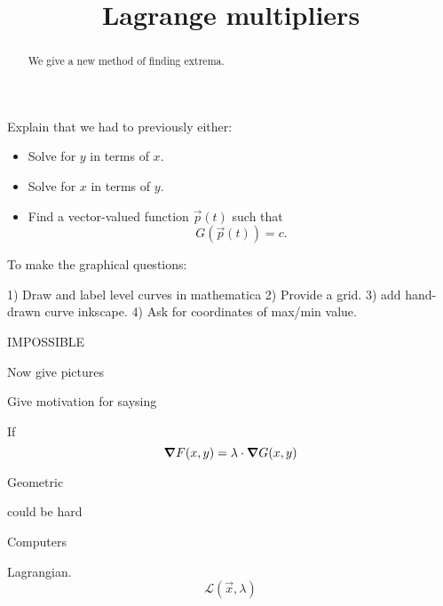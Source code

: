 \documentclass{ximera}
\title[Dig-In:]{Lagrange multipliers}
\begin{document}
\begin{abstract}
  We give a new method of finding extrema. 
\end{abstract}
\maketitle

Explain that we had to previously either:
\begin{itemize}
\item Solve for $y$ in terms of $x$.
\item Solve for $x$ in terms of $y$.
\item Find a vector-valued function $\vec{p}(t)$ such that
  \[
  G(\vec{p}(t)) = c.
  \]
\end{itemize}

To make the graphical questions:

1) Draw and label level curves in mathematica
2) Provide a grid.
3) add hand-drawn curve inkscape.
4) Ask for coordinates of max/min value.



IMPOSSIBLE

Now give pictures

Give motivation for saysing


\begin{theorem}
  If
  \[
  \boldsymbol\nabla F(x,y) = \lambda\cdot  \boldsymbol\nabla G(x,y)
  \]
\end{theorem}

Geometric

could be hard

Computers


Lagrangian.
\[
\mathcal{L}(\vec{x},\lambda)
\]
\end{document}
